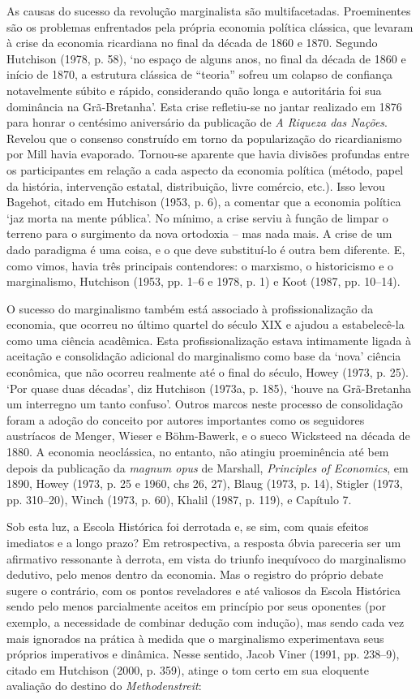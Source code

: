 \documentclass[12pt]{article}
\begin{document}
As causas do sucesso da revolução marginalista são multifacetadas. Proeminentes são os problemas enfrentados pela própria economia política clássica, que levaram à crise da economia ricardiana no final da década de 1860 e 1870. Segundo Hutchison (1978, p. 58), ‘no espaço de alguns anos, no final da década de 1860 e início de 1870, a estrutura clássica de “teoria” sofreu um colapso de confiança notavelmente súbito e rápido, considerando quão longa e autoritária foi sua dominância na Grã-Bretanha’. Esta crise refletiu-se no jantar realizado em 1876 para honrar o centésimo aniversário da publicação de \textit{A Riqueza das Nações}. Revelou que o consenso construído em torno da popularização do ricardianismo por Mill havia evaporado. Tornou-se aparente que havia divisões profundas entre os participantes em relação a cada aspecto da economia política (método, papel da história, intervenção estatal, distribuição, livre comércio, etc.). Isso levou Bagehot, citado em Hutchison (1953, p. 6), a comentar que a economia política ‘jaz morta na mente pública’. No mínimo, a crise serviu à função de limpar o terreno para o surgimento da nova ortodoxia – mas nada mais. A crise de um dado paradigma é uma coisa, e o que deve substituí-lo é outra bem diferente. E, como vimos, havia três principais contendores: o marxismo, o historicismo e o marginalismo, Hutchison (1953, pp. 1–6 e 1978, p. 1) e Koot (1987, pp. 10–14).

O sucesso do marginalismo também está associado à profissionalização da economia, que ocorreu no último quartel do século XIX e ajudou a estabelecê-la como uma ciência acadêmica. Esta profissionalização estava intimamente ligada à aceitação e consolidação adicional do marginalismo como base da ‘nova’ ciência econômica, que não ocorreu realmente até o final do século, Howey (1973, p. 25). ‘Por quase duas décadas’, diz Hutchison (1973a, p. 185), ‘houve na Grã-Bretanha um interregno um tanto confuso’. Outros marcos neste processo de consolidação foram a adoção do conceito por autores importantes como os seguidores austríacos de Menger, Wieser e Böhm-Bawerk, e o sueco Wicksteed na década de 1880. A economia neoclássica, no entanto, não atingiu proeminência até bem depois da publicação da \textit{magnum opus} de Marshall, \textit{Principles of Economics}, em 1890, Howey (1973, p. 25 e 1960, chs 26, 27), Blaug (1973, p. 14), Stigler (1973, pp. 310–20), Winch (1973, p. 60), Khalil (1987, p. 119), e Capítulo 7.

Sob esta luz, a Escola Histórica foi derrotada e, se sim, com quais efeitos imediatos e a longo prazo? Em retrospectiva, a resposta óbvia pareceria ser um afirmativo ressonante à derrota, em vista do triunfo inequívoco do marginalismo dedutivo, pelo menos dentro da economia. Mas o registro do próprio debate sugere o contrário, com os pontos reveladores e até valiosos da Escola Histórica sendo pelo menos parcialmente aceitos em princípio por seus oponentes (por exemplo, a necessidade de combinar dedução com indução), mas sendo cada vez mais ignorados na prática à medida que o marginalismo experimentava seus próprios imperativos e dinâmica. Nesse sentido, Jacob Viner (1991, pp. 238–9), citado em Hutchison (2000, p. 359), atinge o tom certo em sua eloquente avaliação do destino do \textit{Methodenstreit}:
\end{document}

